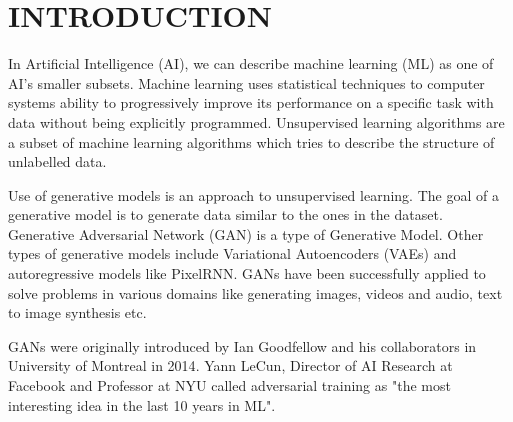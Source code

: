 \singlespacing
\chapter{INTRODUCTION}
In Artificial Intelligence (AI), we can describe machine learning (ML) as one 
of AI's smaller subsets. Machine learning uses statistical techniques to 
computer systems ability to progressively improve its performance on a specific 
task with data without being explicitly programmed.\cite{Samuel59somestudies} 
Unsupervised learning algorithms are a subset of machine learning algorithms 
which tries to describe the structure of unlabelled data. 

Use of generative models\cite{gen_models} is an approach to unsupervised 
learning. The goal of a generative model is to generate data similar to the ones 
in the dataset. 
Generative Adversarial Network (GAN) is a type of Generative Model. Other types 
of generative models include Variational Autoencoders (VAEs) and autoregressive 
models like PixelRNN. GANs have been successfully applied to solve problems in 
various domains like generating images, videos and audio, text to image 
synthesis etc.

GANs were originally introduced by Ian Goodfellow and his collaborators in 
University of Montreal in 2014\cite{gans_basic}.
Yann LeCun, Director of AI Research at Facebook and Professor at NYU called 
adversarial training as {"the most interesting idea in the last 10 years 
in ML"}\cite{yanlecunn_gans}.


